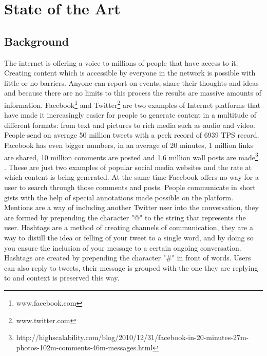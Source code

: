 \chapter{State of the Art}
\label{chapter:stateoftheart}

\section{Background}
\label{sec:background}

The internet is offering a voice to millions of people that have access to it.
Creating content which is accessible by everyone in the network is possible with little or no barriers. Anyone can report on events, share their thoughts and ideas and because there are no limits to this process the results are massive amounts of information.
\newline
Facebook\footnote{www.facebook.com} and Twitter\footnote{www.twitter.com} are two examples of Internet platforms that have made it increasingly easier for people to generate content in a multitude of different formats: from text and pictures to rich media such as audio and video.
\newline
People send on average 50 million tweets with a peek record of 6939 TPS record. Facebook has even bigger numbers, in an average of 20 minutes, 1 million links are shared, 10 million comments are posted and 1,6 million wall posts are made\footnote{http://highscalability.com/blog/2010/12/31/facebook-in-20-minutes-27m-photos-102m-comments-46m-messages.html}. . These are just two examples of popular social media websites and the rate at which content is being generated.
\newline
At the same time Facebook offers no way for a user to search through those comments and posts. 
\newline
People communicate in short gists with the help of special annotations made possible on the platform. Mentions are a way of including another Twitter user into the conversation, they are formed by prepending the character "@" to the string that represents the user. Hashtags are a method of creating channels of communication, they are a way to distill the idea or felling of your tweet to a single word, and by doing so you ensure the inclusion of your message to a certain ongoing conversation. Hashtags are created by prepending the character "\#" in front of words. Users can also reply to tweets, their message is grouped with the one they are replying to and context is preserved this way.

